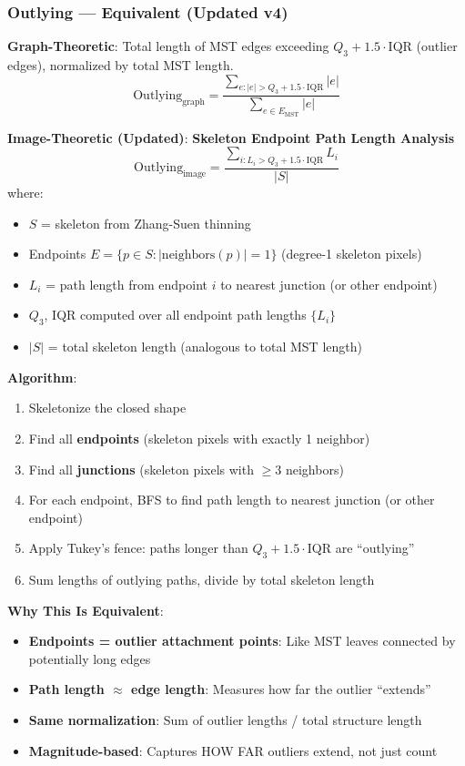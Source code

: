 \documentclass[11pt]{article}
\begin{document}
\subsubsection{Outlying — \textcolor{equivalent}{Equivalent} (Updated v4)}

\textbf{Graph-Theoretic}: Total length of MST edges exceeding $Q_3 + 1.5 \cdot \text{IQR}$ (outlier edges), normalized by total MST length.
\begin{equation}
    \text{Outlying}_{\text{graph}} = \frac{\sum_{e : |e| > Q_3 + 1.5 \cdot \text{IQR}} |e|}{\sum_{e \in E_{\text{MST}}} |e|}
\end{equation}

\textbf{Image-Theoretic (Updated)}: \textbf{Skeleton Endpoint Path Length Analysis}
\begin{equation}
    \text{Outlying}_{\text{image}} = \frac{\sum_{i : L_i > Q_3 + 1.5 \cdot \text{IQR}} L_i}{|S|}
\end{equation}
where:
\begin{itemize}
    \item $S$ = skeleton from Zhang-Suen thinning
    \item Endpoints $E = \{p \in S : |\text{neighbors}(p)| = 1\}$ (degree-1 skeleton pixels)
    \item $L_i$ = path length from endpoint $i$ to nearest junction (or other endpoint)
    \item $Q_3$, IQR computed over all endpoint path lengths $\{L_i\}$
    \item $|S|$ = total skeleton length (analogous to total MST length)
\end{itemize}

\textbf{Algorithm}:
\begin{enumerate}
    \item Skeletonize the closed shape
    \item Find all \textbf{endpoints} (skeleton pixels with exactly 1 neighbor)
    \item Find all \textbf{junctions} (skeleton pixels with $\geq 3$ neighbors)
    \item For each endpoint, BFS to find path length to nearest junction (or other endpoint)
    \item Apply Tukey's fence: paths longer than $Q_3 + 1.5 \cdot \text{IQR}$ are ``outlying''
    \item Sum lengths of outlying paths, divide by total skeleton length
\end{enumerate}

\textbf{Why This Is Equivalent}:
\begin{itemize}
    \item \textbf{Endpoints = outlier attachment points}: Like MST leaves connected by potentially long edges
    \item \textbf{Path length $\approx$ edge length}: Measures how far the outlier ``extends''
    \item \textbf{Same normalization}: Sum of outlier lengths / total structure length
    \item \textbf{Magnitude-based}: Captures HOW FAR outliers extend, not just count
\end{itemize}
\end{document}
